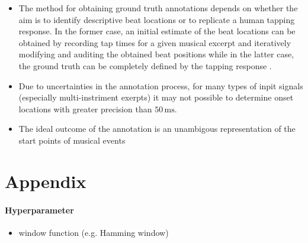 \documentclass{scrartcl}
\begin{document}
\begin{itemize}
\item The method for obtaining ground truth annotations depends on whether the aim is to identify descriptive beat locations or to replicate a human tapping response. In the former case, an initial estimate of the beat locations can be obtained by recording tap times for a given musical excerpt and iteratively modifying and auditing the obtained beat positions while in the latter case, the ground truth can be completely defined by the tapping response \cite{Davies2009b}.
\item Due to uncertainties in the annotation process, for many types of inpit signals (especially multi-instriment exerpts) it may not possible to determine onset locations with greater precision than $50\,\text{ms}$. \cite{Leveau2004}
\item  The ideal outcome of the annotation is an unambigous representation of the start points of musical events
\end{itemize}

\section*{Appendix}

\paragraph{Hyperparameter} 
\begin{itemize}
\item window function (e.g. Hamming window)
\end{itemize}

\newpage 


\end{document}
